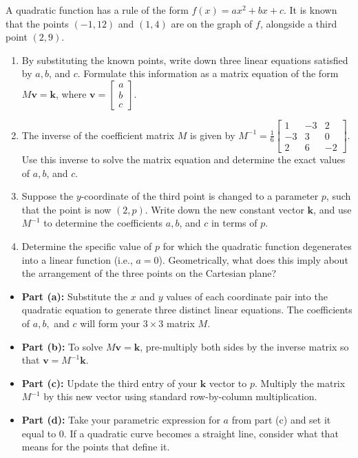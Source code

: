 \begin{problem}
A quadratic function has a rule of the form $f(x) = ax^2 + bx + c$. It is known that the points $(-1, 12)$ and $(1, 4)$ are on the graph of $f$, alongside a third point $(2, 9)$.

\begin{enumerate}[label=\textbf{(\alph*)}]
    \item By substituting the known points, write down three linear equations satisfied by $a, b$, and $c$. Formulate this information as a matrix equation of the form $M \mathbf{v} = \mathbf{k}$, where $\mathbf{v} = \begin{bmatrix} a \\ b \\ c \end{bmatrix}$.
    \item The inverse of the coefficient matrix $M$ is given by $M^{-1} = \frac{1}{6} \begin{bmatrix} 1 & -3 & 2 \\ -3 & 3 & 0 \\ 2 & 6 & -2 \end{bmatrix}$. Use this inverse to solve the matrix equation and determine the exact values of $a, b$, and $c$.
    \item Suppose the $y$-coordinate of the third point is changed to a parameter $p$, such that the point is now $(2, p)$. Write down the new constant vector $\mathbf{k}$, and use $M^{-1}$ to determine the coefficients $a, b$, and $c$ in terms of $p$.
    \item Determine the specific value of $p$ for which the quadratic function degenerates into a linear function (i.e., $a = 0$). Geometrically, what does this imply about the arrangement of the three points on the Cartesian plane?
\end{enumerate}
\end{problem}

\begin{hint}
\begin{itemize}
    \item \textbf{Part (a):} Substitute the $x$ and $y$ values of each coordinate pair into the quadratic equation to generate three distinct linear equations. The coefficients of $a, b,$ and $c$ will form your $3 \times 3$ matrix $M$.
    \item \textbf{Part (b):} To solve $M \mathbf{v} = \mathbf{k}$, pre-multiply both sides by the inverse matrix so that $\mathbf{v} = M^{-1} \mathbf{k}$.
    \item \textbf{Part (c):} Update the third entry of your $\mathbf{k}$ vector to $p$. Multiply the matrix $M^{-1}$ by this new vector using standard row-by-column multiplication.
    \item \textbf{Part (d):} Take your parametric expression for $a$ from part (c) and set it equal to 0. If a quadratic curve becomes a straight line, consider what that means for the points that define it.
\end{itemize}
\end{hint}

